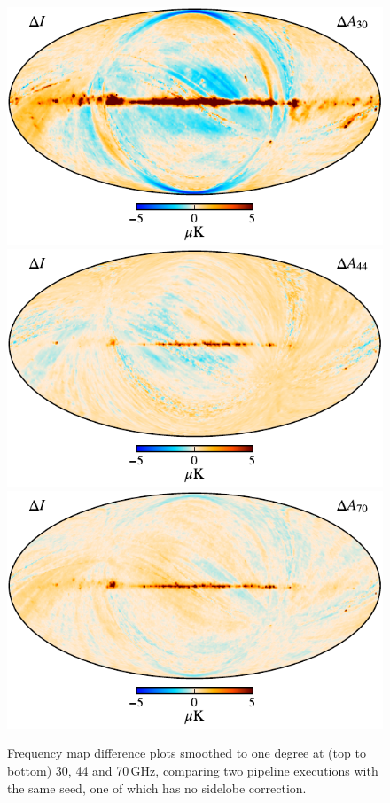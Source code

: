 \documentclass[twocolumn]{aa}
\begin{document}
\begin{figure}[t]
  \center
  \includegraphics[width=0.95\linewidth]{figs/030_diff.pdf}\\
  \includegraphics[width=0.95\linewidth]{figs/044_diff.pdf}\\
  \includegraphics[width=0.95\linewidth]{figs/070_diff.pdf}
  \caption{Frequency map difference plots smoothed to one degree at (top to bottom) 30, 44 and 70\,GHz, comparing two pipeline executions with the same seed, one of which has no sidelobe correction.
  }\label{fig:freqdiff}
\end{figure}
\end{document}

